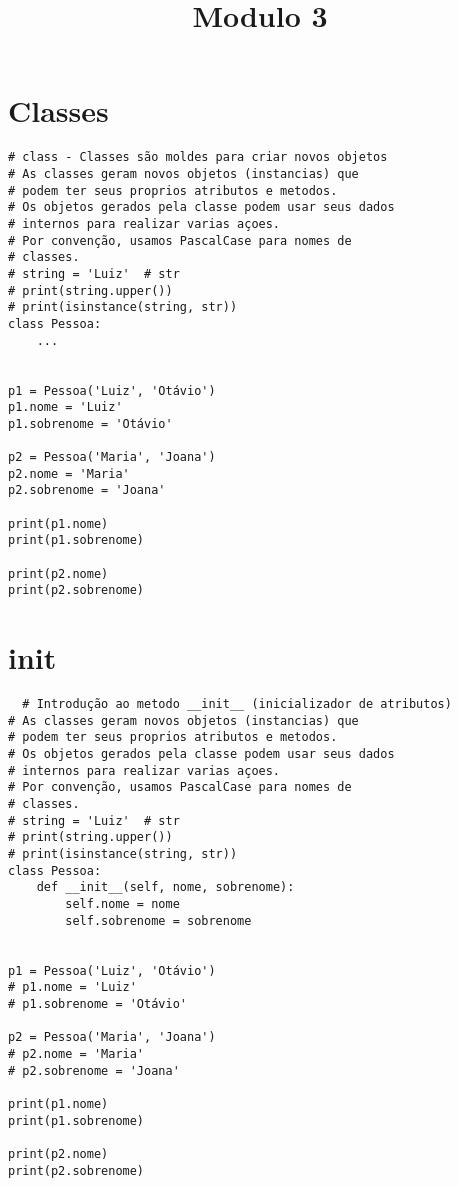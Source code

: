 \documentclass{article}
\date{} %
\title{Modulo 3}
\begin{document}
\maketitle
\tableofcontents
\newpage
\section{Classes}
\begin{lstlisting}
# class - Classes são moldes para criar novos objetos
# As classes geram novos objetos (instancias) que
# podem ter seus proprios atributos e metodos.
# Os objetos gerados pela classe podem usar seus dados
# internos para realizar varias açoes.
# Por convenção, usamos PascalCase para nomes de
# classes.
# string = 'Luiz'  # str
# print(string.upper())
# print(isinstance(string, str))
class Pessoa:
    ...


p1 = Pessoa('Luiz', 'Otávio')
p1.nome = 'Luiz'
p1.sobrenome = 'Otávio'

p2 = Pessoa('Maria', 'Joana')
p2.nome = 'Maria'
p2.sobrenome = 'Joana'

print(p1.nome)
print(p1.sobrenome)

print(p2.nome)
print(p2.sobrenome)
\end{lstlisting}

\section{init}
\begin{lstlisting}
  # Introdução ao metodo __init__ (inicializador de atributos)
# As classes geram novos objetos (instancias) que
# podem ter seus proprios atributos e metodos.
# Os objetos gerados pela classe podem usar seus dados
# internos para realizar varias açoes.
# Por convenção, usamos PascalCase para nomes de
# classes.
# string = 'Luiz'  # str
# print(string.upper())
# print(isinstance(string, str))
class Pessoa:
    def __init__(self, nome, sobrenome):
        self.nome = nome
        self.sobrenome = sobrenome


p1 = Pessoa('Luiz', 'Otávio')
# p1.nome = 'Luiz'
# p1.sobrenome = 'Otávio'

p2 = Pessoa('Maria', 'Joana')
# p2.nome = 'Maria'
# p2.sobrenome = 'Joana'

print(p1.nome)
print(p1.sobrenome)

print(p2.nome)
print(p2.sobrenome)
\end{lstlisting}
\end{document}
